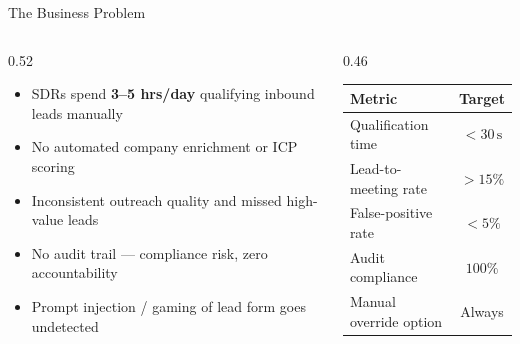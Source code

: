 \documentclass[aspectratio=169,10pt]{beamer}
\newcommand{\icon}[1]{\textcolor{purple}{#1}}
\begin{document}
\begin{frame}{The Business Problem}
\begin{columns}[T]
\begin{column}{0.52\textwidth}
  \begin{tcolorbox}[colback=hotcolor!5,colframe=hotcolor!60,arc=3mm,title={\icon{\faExclamationTriangle}\; Pain Points}]
    \begin{itemize}\setlength\itemsep{5pt}
      \item SDRs spend \textbf{3--5 hrs/day} qualifying inbound leads manually
      \item No automated company enrichment or ICP scoring
      \item Inconsistent outreach quality and missed high-value leads
      \item No audit trail — compliance risk, zero accountability
      \item Prompt injection / gaming of lead form goes undetected
    \end{itemize}
  \end{tcolorbox}
\end{column}
\begin{column}{0.46\textwidth}
  \begin{tcolorbox}[colback=accentgreen!5,colframe=accentgreen!60,arc=3mm,title={\icon{\faChartLine}\; Target KPIs}]
    \centering
    \begin{tabular}{@{}lc@{}}
      \toprule
      \textbf{Metric} & \textbf{Target} \\
      \midrule
      Qualification time     & $<30\,\text{s}$ \\
      Lead-to-meeting rate   & $>15\%$         \\
      False-positive rate    & $<5\%$          \\
      Audit compliance       & $100\%$         \\
      Manual override option & Always           \\
      \bottomrule
    \end{tabular}
  \end{tcolorbox}
\end{column}
\end{columns}
\end{frame}
\end{document}
